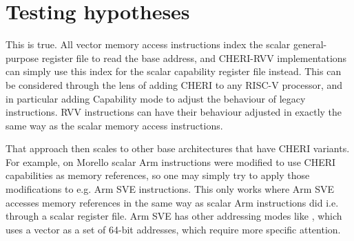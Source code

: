 \section{Testing hypotheses}

This is true.
All vector memory access instructions index the scalar general-purpose register file to read the base address, and CHERI-RVV implementations can simply use this index for the scalar capability register file instead.
This can be considered through the lens of adding CHERI to any RISC-V processor, and in particular adding Capability mode to adjust the behaviour of legacy instructions.
RVV instructions can have their behaviour adjusted in exactly the same way as the scalar memory access instructions.

That approach then scales to other base architectures that have CHERI variants.
For example, on Morello scalar Arm instructions were modified to use CHERI capabilities as memory references, so one may simply try to apply those modifications to e.g. Arm SVE instructions.
This only works where Arm SVE accesses memory references in the same way as scalar Arm instructions did i.e. through a scalar register file.
Arm SVE has other addressing modes like , which uses a vector as a set of 64-bit addresses, which require more specific attention.





